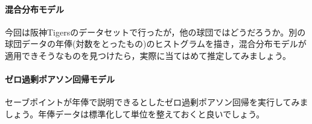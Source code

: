 \documentclass{ltjsbook}
\begin{document}
\paragraph{混合分布モデル}今回は阪神Tigersのデータセットで行ったが，他の球団ではどうだろうか。別の球団データの年俸(対数をとったもの)のヒストグラムを描き，混合分布モデルが適用できそうなものを見つけたら，実際に当てはめて推定してみましょう。
\paragraph{ゼロ過剰ポアソン回帰モデル}セーブポイントが年俸で説明できるとしたゼロ過剰ポアソン回帰を実行してみましょう。年俸データは標準化して単位を整えておくと良いでしょう。
\end{document}
